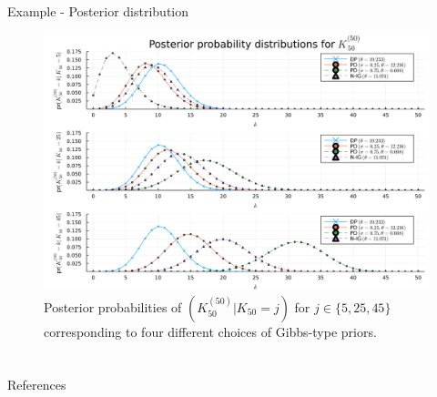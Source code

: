 \documentclass[11pt, handout]{beamer}
\begin{document}
\begin{frame}{Example - Posterior distribution} 
    \begin{figure}
        \includegraphics[scale=0.1]{../img/posterior_probability.png}
        \caption{Posterior probabilities of \((K^{(50)}_{50} | K_{50} = j)\) for \(j \in \{5, 25, 45\}\) corresponding to four different choices of Gibbs-type priors.}
        \label{fig:posterior}
    \end{figure}
\end{frame}

\section*{}
\begin{frame}{References}
    \scriptsize{}
    
\end{frame}
 
\end{document}
